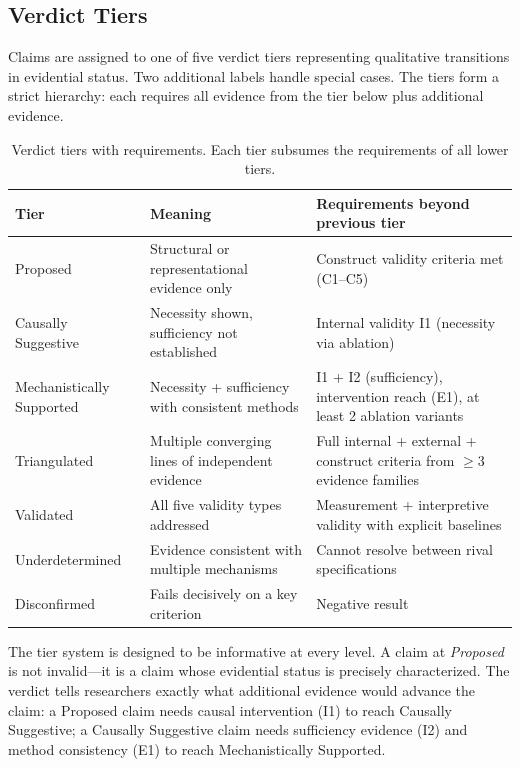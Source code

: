 \documentclass[10pt]{article}
\newcommand{\tighttable}{\setlength{\tabcolsep}{4pt}\renewcommand{\arraystretch}{1.05}}
\begin{document}
\subsection{Verdict Tiers}
\label{sec:verdict-tiers}

Claims are assigned to one of five verdict tiers representing qualitative transitions in evidential status. Two additional labels handle special cases. The tiers form a strict hierarchy: each requires all evidence from the tier below plus additional evidence.

\begin{table}[t]
\centering
\tighttable
\caption{Verdict tiers with requirements. Each tier subsumes the requirements of all lower tiers.}
\label{tab:verdicts}
\small
\begin{tabular}{@{}lp{4.5cm}p{5.5cm}@{}}
\toprule
\textbf{Tier} & \textbf{Meaning} & \textbf{Requirements beyond previous tier} \\
\midrule
Proposed & Structural or representational evidence only & Construct validity criteria met (C1--C5) \\
Causally Suggestive & Necessity shown, sufficiency not established & Internal validity I1 (necessity via ablation) \\
Mechanistically Supported & Necessity + sufficiency with consistent methods & I1 + I2 (sufficiency), intervention reach (E1), at least 2 ablation variants \\
Triangulated & Multiple converging lines of independent evidence & Full internal + external + construct criteria from $\geq 3$ evidence families \\
Validated & All five validity types addressed & Measurement + interpretive validity with explicit baselines \\
\midrule
Underdetermined & Evidence consistent with multiple mechanisms & Cannot resolve between rival specifications \\
Disconfirmed & Fails decisively on a key criterion & Negative result \\
\bottomrule
\end{tabular}
\end{table}


The tier system is designed to be informative at every level. A claim at \emph{Proposed} is not invalid---it is a claim whose evidential status is precisely characterized. The verdict tells researchers exactly what additional evidence would advance the claim: a Proposed claim needs causal intervention (I1) to reach Causally Suggestive; a Causally Suggestive claim needs sufficiency evidence (I2) and method consistency (E1) to reach Mechanistically Supported.
\end{document}
